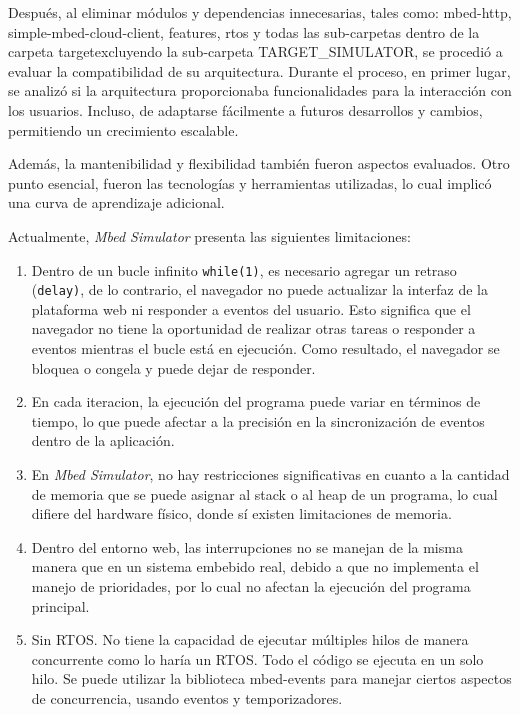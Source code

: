 Después, al eliminar módulos y dependencias innecesarias, tales como: mbed-http, simple-mbed-cloud-client, features, rtos y todas las sub-carpetas dentro de la carpeta \textquotedbl target\textquotedbl excluyendo la sub-carpeta TARGET\_SIMULATOR, se procedió a evaluar la compatibilidad de su arquitectura. Durante el proceso, en primer lugar, se analizó si la arquitectura proporcionaba funcionalidades para la interacción con los usuarios. Incluso, de adaptarse fácilmente a futuros desarrollos y cambios, permitiendo un crecimiento escalable.

Además, la mantenibilidad y flexibilidad también fueron aspectos evaluados. Otro punto esencial, fueron las tecnologías y herramientas utilizadas, lo cual implicó una curva de aprendizaje adicional. 

Actualmente, \textit{Mbed Simulator} presenta las siguientes limitaciones:

\begin{enumerate}
	\item Dentro de un bucle infinito \texttt{while(1)}, es necesario agregar un retraso \newline(\texttt{delay)}, de lo contrario, el navegador no puede actualizar la interfaz de la plataforma web ni responder a eventos del usuario. Esto significa que el navegador no tiene la oportunidad de realizar otras tareas o responder a eventos mientras el bucle está en ejecución. Como resultado, el navegador se bloquea o congela y puede dejar de responder.
	
	\item En cada iteracion, la ejecución del programa puede variar en términos de tiempo, lo que puede afectar a la precisión en la sincronización de eventos dentro de la aplicación.

	\item En \textit{Mbed Simulator}, no hay restricciones significativas en cuanto a la cantidad de memoria que se puede asignar al stack o al heap  de un programa, lo cual difiere del hardware físico, donde sí existen limitaciones de memoria.
	
	\item Dentro del entorno web, las interrupciones no se manejan de la misma manera que en un sistema embebido real, debido a que no implementa el manejo de prioridades, por lo cual no afectan la ejecución del programa principal.
	
	\item Sin RTOS. No tiene la capacidad de ejecutar múltiples hilos de manera concurrente como lo haría un RTOS. Todo el código se ejecuta en un solo hilo. Se puede utilizar la biblioteca mbed-events para manejar ciertos aspectos de concurrencia, usando eventos y temporizadores.

\end{enumerate}

